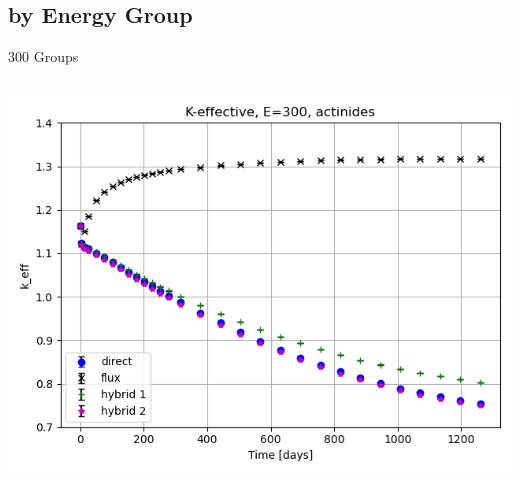 \documentclass[
	11pt, %
	aspectratio=169, %
]{beamer}
\begin{document}

\subsection{by Energy Group}

\begin{frame}{300 Groups}
	\begin{columns}[c] %
		\begin{column}{0.32\textwidth} %
			\includegraphics[width=\textwidth]{../figures/keff/keff_actinides_300.png}


\end{column}
\end{columns}
\end{frame}
\end{document}
